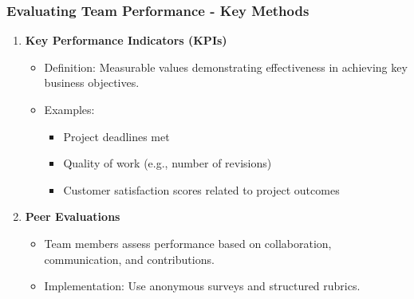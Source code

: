 \documentclass[aspectratio=169]{beamer}
\begin{document}
\begin{frame}[fragile]
    \frametitle{Evaluating Team Performance - Key Methods}
    \begin{enumerate}
        \item \textbf{Key Performance Indicators (KPIs)}
            \begin{itemize}
                \item Definition: Measurable values demonstrating effectiveness in achieving key business objectives.
                \item Examples: 
                \begin{itemize}
                    \item Project deadlines met
                    \item Quality of work (e.g., number of revisions)
                    \item Customer satisfaction scores related to project outcomes
                \end{itemize}
            \end{itemize}
        \item \textbf{Peer Evaluations}
            \begin{itemize}
                \item Team members assess performance based on collaboration, communication, and contributions.
                \item Implementation: Use anonymous surveys and structured rubrics.
            \end{itemize}
    \end{enumerate}
\end{frame}
\end{document}
